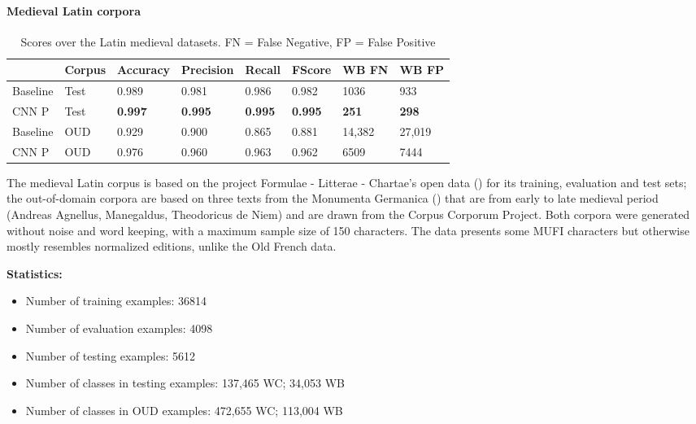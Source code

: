 \documentclass{jdmdh}
\begin{document}
\paragraph{Medieval Latin corpora}

\begin{table}[H]
\centering
\begin{tabular}{llllllll}
\hline
 & Corpus & Accuracy & Precision & Recall & FScore & WB FN & WB FP \\ \hline
Baseline & Test & 0.989 & 0.981 & 0.986 & 0.982 & 1036 & 933 \\
CNN P & Test & \textbf{0.997} & \textbf{0.995} & \textbf{0.995} & \textbf{0.995} & \textbf{251} & \textbf{298} \\ \hline
Baseline & OUD & 0.929 & 0.900 & 0.865 & 0.881 & 14,382 & 27,019 \\
CNN P & OUD & 0.976 & 0.960 & 0.963 & 0.962 & 6509 & 7444\\ \hline
\end{tabular}
\caption{Scores over the Latin medieval datasets. FN = False Negative, FP = False Positive}
\label{tab:medieval_latin_corpora}
\end{table}


The medieval Latin corpus is based on the project Formulae - Litterae - Chartae's open data (\citet{formulae}) for its training, evaluation and test sets; the out-of-domain corpora are based on three texts from the Monumenta Germanica (\citet{germanica}) that are from early to late medieval period (Andreas Agnellus, Manegaldus, Theodoricus de Niem) and are drawn from the Corpus Corporum Project. Both corpora were generated without noise and word keeping, with a maximum sample size of 150 characters. The data presents some MUFI characters but otherwise mostly resembles normalized editions, unlike the Old French data.

\textbf{Statistics:}

\begin{itemize}
\item Number of training examples: 36814
\item Number of evaluation examples: 4098
\item Number of testing examples: 5612
\item Number of classes in testing examples: 137,465 WC; 34,053 WB
\item Number of classes in OUD examples: 472,655 WC; 113,004 WB
\end{itemize}
\end{document}
